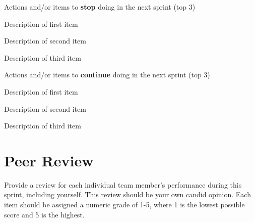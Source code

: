 \documentclass{article}
\begin{document}
Actions and/or items to \textbf{stop} doing in the next sprint (top 3)
\begin{itemize}
\begin{item}
Description of first item
\end{item}
\begin{item}
Description of second item
\end{item}
\begin{item}
Description of third item
\end{item}
\end{itemize}

Actions and/or items to \textbf{continue} doing in the next sprint (top 3)
\begin{itemize}
\begin{item}
Description of first item
\end{item}
\begin{item}
Description of second item
\end{item}
\begin{item}
Description of third item
\end{item}
\end{itemize}


\section{Peer Review}
Provide a review for each individual team member's performance during this sprint, including yourself. This review should be your own candid opinion. Each item should be assigned a numeric grade of 1-5, where 1 is the lowest possible score and 5 is the highest. \\
\end{document}
